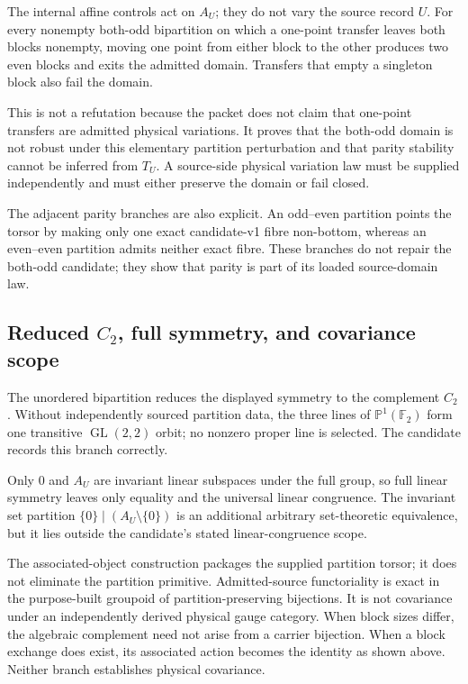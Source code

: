 The internal affine controls act on \(A_U\); they do not vary the source
record \(U\).  For every nonempty both-odd bipartition on which a one-point
transfer leaves both blocks nonempty, moving one point from either block to
the other produces two even blocks and exits the admitted domain.  Transfers
that empty a singleton block also fail the domain.

This is not a refutation because the packet does not claim that one-point
transfers are admitted physical variations.  It proves that the both-odd
domain is not robust under this elementary partition perturbation and that
parity stability cannot be inferred from \(T_U\).  A source-side physical
variation law must be supplied independently and must either preserve the
domain or fail closed.

The adjacent parity branches are also explicit.  An odd--even partition
points the torsor by making only one exact candidate-v1 fibre non-bottom,
whereas an even--even partition admits neither exact fibre.  These branches
do not repair the both-odd candidate; they show that parity is part of its
loaded source-domain law.

\subsection{Reduced \(C_2\), full symmetry, and covariance scope}

The unordered bipartition reduces the displayed symmetry to the complement
\(C_2\).  Without independently sourced partition data, the three lines of
\(\mathbb P^1(\mathbb F_2)\) form one transitive
\(\operatorname{GL}(2,2)\) orbit; no nonzero proper line is selected.  The
candidate records this branch correctly.

Only \(0\) and \(A_U\) are invariant linear subspaces under the full group, so
full linear symmetry leaves only equality and the universal linear
congruence.  The invariant set partition
\(\{0\}\mid(A_U\setminus\{0\})\) is an additional arbitrary set-theoretic
equivalence, but it lies outside the candidate's stated linear-congruence
scope.

The associated-object construction packages the supplied partition torsor; it
does not eliminate the partition primitive.  Admitted-source functoriality is
exact in the purpose-built groupoid of partition-preserving bijections.  It is
not covariance under an independently derived physical gauge category.  When
block sizes differ, the algebraic complement need not arise from a carrier
bijection.  When a block exchange does exist, its associated action becomes
the identity as shown above.  Neither branch establishes physical covariance.

